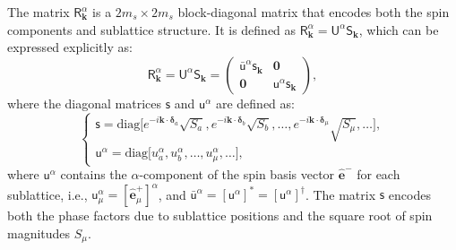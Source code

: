 \documentclass[aps, prx, nofootinbib, superscriptaddress]{revtex4-2}
\begin{document}
The matrix $\mathsf{R}^{\alpha}_{\mathbf{k}}$ is a $2m_s \times 2m_s$ block-diagonal matrix that encodes both the spin components and sublattice structure. It is defined as $\mathsf{R}^{\alpha}_{\mathbf{k}} = \mathsf{U}^{\alpha} \mathsf{S}_{\mathbf{k}}$, which can be expressed explicitly as:
\begin{equation}
    \mathsf{R}^{\alpha}_{\mathbf{k}} 
    = \mathsf{U}^{\alpha} \mathsf{S}_{\mathbf{k}}
    =
    \begin{pmatrix}
        \bar{\mathsf{u}}^{\alpha} \mathsf{s}_{\mathbf{k}} & \mathbf{0} \\
        \mathbf{0} & \mathsf{u}^{\alpha} \mathsf{s}_{\mathbf{k}} 
    \end{pmatrix},
\end{equation}
where the diagonal matrices $\mathsf{s}$ and $\mathsf{u}^{\alpha}$ are defined as:
\begin{equation}
    \begin{cases}
        \mathsf{s} = \text{diag} \big[ e^{-i \mathbf{k} \cdot \boldsymbol{\delta}_a} \sqrt{S_a}, e^{-i \mathbf{k} \cdot \boldsymbol{\delta}_b} \sqrt{S_b}, \dots, e^{-i \mathbf{k} \cdot \boldsymbol{\delta}_\mu} \sqrt{S_\mu}, \dots \big], \\
        \mathsf{u}^{\alpha} = \text{diag} \big[ u_a^{\alpha}, u_b^{\alpha}, \dots, u_\mu^{\alpha}, \dots \big],
    \end{cases}
\end{equation}
where $\mathsf{u}^{\alpha}$ contains the $\alpha$-component of the spin basis vector $\hat{\mathbf{e}}^-$ for each sublattice, i.e., $\mathsf{u}^{\alpha}_\mu = [\hat{\mathbf{e}}^+_\mu]^{\alpha}$, and $\bar{\mathsf{u}}^{\alpha} = [\mathsf{u}^{\alpha}]^* = [\mathsf{u}^{\alpha}]^{\dagger}$. The matrix $\mathsf{s}$ encodes both the phase factors due to sublattice positions and the square root of spin magnitudes $S_\mu$.
\end{document}
